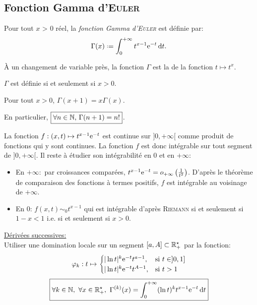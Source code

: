 \subsection{Fonction Gamma d'\textsc{Euler}}

\begin{marginfigure}[5cm]
    
    \caption*{\centering Graphe de la fonction Gamma}
\end{marginfigure}

\begin{defi}
    Pour tout $x$ > 0 réel, la \emph{fonction Gamma d'\textsc{Euler}} est définie par: 
    $$\Gamma(x) \defeq \int_{0}^{+\infty} t^{x-1} \me^{-t} \d t.$$
\end{defi}


\begin{remarque}
    À un changement de variable près, la fonction $\Gamma$ est la  de la fonction $t \mapsto t^x$. 
\end{remarque} 

\begin{prop}
    \item $\Gamma$ est définie si et seulement si $x>0$.
    \item Pour tout $x > 0$, $\Gamma(x+1) = x\Gamma(x)$.
    \item En particulier, $\boxed{\forall n \in \mathbb{N}$, $\Gamma(n+1) = n!}$. 
\end{prop}
\begin{preuve}
    La fonction $f:(x,t) \mapsto t^{x-1} \mathrm{e}^{-t}$ est continue sur $]0, + \infty[$ comme produit de fonctions qui y sont continues. La fonction $f$ est donc intégrable sur tout segment de $]0, +\infty[$. Il reste à étudier son intégrabilité en $0$ et en $+ \infty$:
    \begin{itemize}
        \item En $+\infty:$ par croissances comparées, $t^{x-1} \mathrm{e}^{-t} = o_{+\infty} \left(\frac{1}{t^2} \right)$. D'après le théorème de comparaison des fonctions à termes positifs, $f$ est intégrable au voisinage de $+\infty$.
        \item En $0$: $f(x,t) \sim_0 t^{x-1}$ qui est intégrable d'après \textsc{Riemann} si et seulement si $1-x < 1$ i.e. si et seulement si $\boxed{x > 0}$.
    \end{itemize}
\end{preuve}
\underline{Dérivées successives:} \\
Utiliser une domination locale sur un segment $[a, A] \subset \mathbb{R}_+^\star$ par la fonction:
$$\varphi_k:t \mapsto 
\begin{cases}
    |\ln t |^k \mathrm{e}^{-t} t^{a-1}, & \text{si } t \in ]0, 1] \\
    |\ln t |^k \mathrm{e}^{-t} t^{A-1}, & \text{si } t > 1
\end{cases}
$$
$$\boxed{\forall k \in \mathbb{N},\ \forall x \in \mathbb{R}_+^\star,\ \Gamma^{(k)}(x) = \int_{0}^{+\infty} (\ln t)^k t^{x-1} \mathrm{e}^{-t} \, \mathrm{d} t}$$

